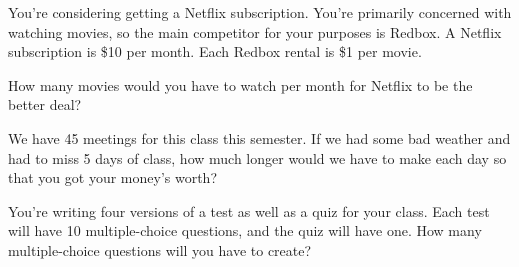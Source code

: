 \begin{exercise}
You're considering getting a Netflix subscription.  You're primarily concerned with watching movies, so the main competitor for your purposes is Redbox.  A Netflix subscription is \$10 per month.  Each Redbox rental is \$1 per movie.

How many movies would you have to watch per month for Netflix to be the better deal?
\end{exercise}
\bigskip

\begin{exercise}
We have 45 meetings for this class this semester.  If we had some bad weather and had to miss 5 days of class, how much longer would we have to make each day so that you got your money's worth?
\end{exercise}
\bigskip

\begin{exercise}
You're writing four versions of a test as well as a quiz for your class.  Each test will have 10 multiple-choice questions, and the quiz will have one.  How many multiple-choice questions will you have to create?
\end{exercise}
\bigskip